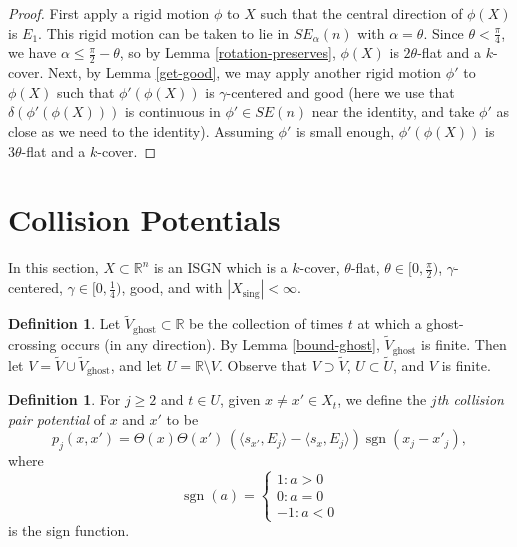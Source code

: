 \documentclass[11pt,reqno,twoside]{amsart}
\newcommand{\sing}{\mathrm{sing}}
\DeclareMathOperator{\sign}{\mathrm{sgn}}
\theoremstyle{definition}
\newtheorem{definition}[lemma]{Definition}
\begin{document}
\begin{proof}
 First apply a rigid motion $\phi$ to $X$ such that the central direction of $\phi(X)$ is $E_1$. This rigid motion can be taken to lie in $SE_\alpha(n)$ with $\alpha = \theta$. Since $\theta < \frac{\pi}{4}$, we have $\alpha \leq \frac{\pi}{2} - \theta$, so by Lemma \ref{rotation-preserves}, $\phi(X)$ is $2\theta$-flat and a $k$-cover. 
 Next, by Lemma \ref{get-good}, we may apply another rigid motion $\phi'$ to $\phi(X)$ such that $\phi'(\phi(X))$ is $\gamma$-centered and good (here we use that $\delta(\phi'(\phi(X)))$ is continuous in $\phi' \in SE(n)$ near the identity, and take $\phi'$ as close as we need to the identity). Assuming $\phi'$ is small enough, $\phi'(\phi(X))$ is $3\theta$-flat and a $k$-cover. 
\end{proof}

\section{Collision Potentials}
\label{sec:colllisionpotentials}

In this section, $X \subset \mathbb{R}^n$ is an ISGN which is a $k$-cover, $\theta$-flat, $\theta \in [0,\frac{\pi}{2})$, $\gamma$-centered, $\gamma \in [0,\frac{1}{4})$, good, and with $|X_\sing| < \infty.$

\begin{definition}
Let $\tilde V_\mathrm{ghost} \subset \mathbb{R}$ be the collection of times $t$ at which a ghost-crossing occurs (in any direction). By Lemma \ref{bound-ghost}, $\tilde V_{\mathrm{ghost}}$ is finite.
Then let $V = \tilde V \cup \tilde V_{\mathrm{ghost}}$, and let $U = \mathbb{R} \setminus V.$ Observe that $V \supset \tilde V$, $U \subset \tilde U$, and $V$ is finite.
\end{definition}

\begin{definition}
    For $j \geq 2$ and $t \in U$, given $x \neq x' \in X_t$,
    we define the $j$\emph{th collision pair potential} of $x$ and $x'$ to be 
    \[p_j(x,x') = \Theta(x)\Theta(x') \, (\langle s_{x'},E_j\rangle-\langle s_x,E_j\rangle) \sign (x_j - x'_j), \]
     where 
     \[\sign(a) = \begin{cases} 1: a > 0 \\ 
     0 : a = 0 \\ 
     -1 : a < 0
     \end{cases}\]
     is the sign function.
\end{definition}
\end{document}
